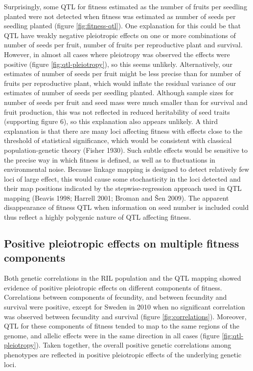 \documentclass[]{article}
\begin{document}
Surprisingly, some QTL for fitness estimated as the number of fruits per seedling planted were not detected when fitness was estimated as number of seeds per seedling planted (figure \ref{fig:fitness-qtl}).
One explanation for this could be that QTL have weakly negative pleiotropic effects on one or more combinations of number of seeds per fruit, number of fruits per reproductive plant and survival.
However, in almost all cases where pleiotropy was observed the effects were positive (figure \ref{fig:qtl-pleiotropy}), so this seems unlikely.
Alternatively, our estimates of number of seeds per fruit might be less precise than for number of fruits per reproductive plant, which would inflate the residual variance of our estimates of number of seeds per seedling planted.
Although sample sizes for number of seeds per fruit and seed mass were much smaller than for survival and fruit production, this was not reflected in reduced heritability of seed traits (supporting figure 6), so this explanation also appears unlikely.
A third explanation is that there are many loci affecting fitness with effects close to the threshold of statistical significance, which would be consistent with classical population-genetic theory (Fisher 1930).
Such subtle effects would be sensitive to the precise way in which fitness is defined, as well as to fluctuations in environmental noise.
Because linkage mapping is designed to detect relatively few loci of large effect, this would cause some stochasticity in the loci detected and their map positions indicated by the stepwise-regression approach used in QTL mapping (Beavis 1998; Harrell 2001; Broman and Šen 2009).
The apparent disappearance of fitness QTL when information on seed number is included could thus reflect a highly polygenic nature of QTL affecting fitness.

\hypertarget{positive-pleiotropic-effects-on-multiple-fitness-components}{%
\subsection{Positive pleiotropic effects on multiple fitness components}\label{positive-pleiotropic-effects-on-multiple-fitness-components}}

Both genetic correlations in the RIL population and the QTL mapping showed evidence of positive pleiotropic effects on different components of fitness.
Correlations between components of fecundity, and between fecundity and survival were positive, except for Sweden in 2010 when no significant correlation was observed between fecundity and survival (figure \ref{fig:correlations}).
Moreover, QTL for these components of fitness tended to map to the same regions of the genome, and allelic effects were in the same direction in all cases (figure \ref{fig:qtl-pleiotropy}).
Taken together, the overall positive genetic correlations among phenotypes are reflected in positive pleiotropic effects of the underlying genetic loci.
\end{document}
